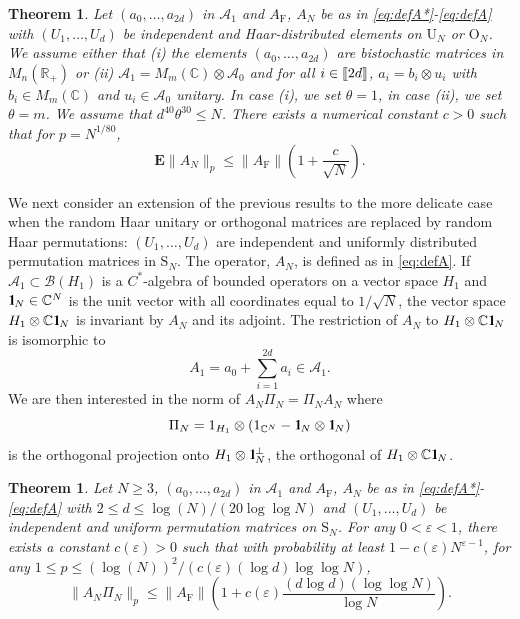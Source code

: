 \documentclass[11pt]{article}
\renewcommand{\star}{{\mathrm{F}}}
\newtheorem{theorem}[lemma]{Theorem}
\newcommand{\cA}{\mathcal{A}}
\newcommand{\dE}{\mathbf {E}}
\newcommand{\dU}{\mathrm {U}}
\newcommand{\dS}{\mathrm{S}}
\newcommand{\dO}{\mathrm{O}}
\newcommand{\dR}{\mathbb {R}}
\newcommand{\dC}{\mathbb {C}}
\newcommand{\cB}{\mathcal{B}}
\newcommand{\PAR}[1]{{{\left(#1\right)}}} %
\newcommand{\1}{1\!\!{\sf I}}
\newcommand{\IND}{\1}
\newcommand{\veps}{\varepsilon}
\newcommand{\INT}[1]{{{\left[\hspace{-1.4pt}\left[#1\right]\hspace{-1.4pt}\right]}}}
\begin{document}
\begin{theorem}
\label{th:main2}
Let $(a_0,\ldots,a_{2d})$ in $\cA_1$ and $A_\star$, $A_N$ be as in \eqref{eq:defA*}-\eqref{eq:defA} with  $(U_1,\ldots, U_d)$ be independent and Haar-distributed elements on $\dU_N$ or $\dO_N$. We assume either that (i) the elements $(a_0,\ldots,a_{2d})$ are bistochastic matrices in $M_n(\dR_+)$ or (ii) $\cA_1 = M_m(\dC) \otimes \cA_0$ and for all $ i \in \INT{ 2d}$, $a_i = b_i \otimes u_i$ with $b_i \in M_m(\dC)$ and $u_i \in \cA_0$ unitary. In case (i), we set $\theta =1$, in case (ii), we set $\theta = m$. We assume that $d^{40} \theta^{30} \leq N$. There exists a numerical constant $c >0$ such that for  $p =  N^{1/80}$,
$$
\dE \| A_N \|_p  \leq  \| A_\star \| \PAR{ 1 + \frac{c}{\sqrt N}}.
$$
\end{theorem}

We next consider an extension of the previous results to the more delicate case when the random Haar unitary or orthogonal matrices are replaced by random Haar permutations: $(U_1,\ldots,U_d)$ are independent and uniformly distributed permutation matrices in $\dS_N$. The operator, $A_N$, is defined as in \eqref{eq:defA}. If $\cA_1 \subset \cB(H_1)$ is a $C^*$-algebra of bounded operators on a vector space $H_1$ and $\IND_N \in \dC^N$ is the unit vector with all coordinates equal to $1/\sqrt N$, the vector space $H_1 \otimes \dC \IND_N$ is invariant by $A_N$ and its adjoint. The restriction of $A_N$ to $H_1 \otimes \dC \IND_N$ is isomorphic to 
$$A_1 = a_0 + \sum_{i=1}^{2d} a_i  \in \cA_1.$$
We are then interested in the norm of $A_N \Pi_N = \Pi_N A_N$ where 
\begin{equation}\label{eq:defPiN}
\Pi_N = 1_{H_1} \otimes \PAR{1_{\dC^N} -  \IND_N \otimes \IND_N}
\end{equation}
is the orthogonal projection onto $H_1 \otimes \IND_N^\perp$, the orthogonal of $H_1 \otimes \dC \IND_N$. 

\begin{theorem}
\label{th:main3}
Let $N \geq 3$, $(a_0,\ldots,a_{2d})$ in $\cA_1$ and $A_\star$, $A_N$ be as in \eqref{eq:defA*}-\eqref{eq:defA} with $2 \leq d \leq \log ( N) / (20 \log \log N)$ and $(U_1,\ldots, U_d)$ be independent and uniform permutation matrices on $\dS_N$. For any $0 < \veps < 1$, there exists a constant $c(\veps) >0$ such that with probability at least $1 - c(\veps) N^{\veps -1}$, for any $1 \leq p  \leq (\log ( N)) ^2 / (c(\veps) (\log d ) \log \log N)$, 
$$
 \| A_N\Pi_N \|_{p}  \leq  \| A_\star \| \PAR{ 1 + c(\veps)\frac{(d \log d) (\log \log N) }{\log N}}.
$$
\end{theorem}
\end{document}
